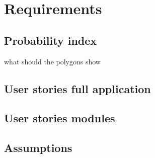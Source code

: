 \chapter{Requirements}

\section{Probability index}
what should the polygons show

\section{User stories full application}

\section{User stories modules}

\section{Assumptions}